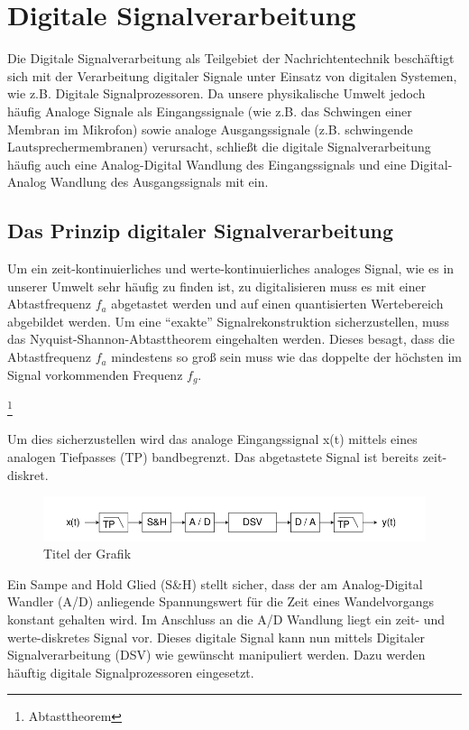 \documentclass[a4paper,12pt,fontsize=12,DIV=12]{scrartcl}
\begin{document}
\section{Digitale Signalverarbeitung}
Die Digitale Signalverarbeitung als Teilgebiet der Nachrichtentechnik beschäftigt sich mit der Verarbeitung digitaler Signale unter Einsatz von digitalen Systemen, wie z.B. Digitale Signalprozessoren.
Da unsere physikalische Umwelt jedoch häufig Analoge Signale als Eingangssignale (wie z.B. das Schwingen einer Membran im Mikrofon) sowie analoge Ausgangssignale (z.B. schwingende Lautsprechermembranen) verursacht, schließt die digitale Signalverarbeitung häufig auch eine Analog-Digital Wandlung des Eingangssignals und eine Digital-Analog Wandlung des Ausgangssignals mit ein.

\subsection{Das Prinzip digitaler Signalverarbeitung}
Um ein zeit-kontinuierliches und werte-kontinuierliches analoges Signal, wie es in unserer Umwelt sehr häufig zu finden ist, zu digitalisieren muss es mit einer Abtastfrequenz $f_a$ abgetastet werden und auf einen quantisierten Wertebereich abgebildet werden. 
Um eine "`exakte"' Signalrekonstruktion sicherzustellen, muss das Nyquist-Shannon-Abtasttheorem eingehalten werden. Dieses besagt, dass die Abtastfrequenz $f_a$ mindestens so groß sein muss wie das doppelte der höchsten im Signal vorkommenden Frequenz $f_g$.
\begin{center}
 \footnote{Abtasttheorem }\\
\end{center}
Um dies sicherzustellen wird das analoge Eingangssignal x(t) mittels eines analogen Tiefpasses (TP) bandbegrenzt. Das abgetastete Signal ist bereits zeit-diskret.
%
\begin{figure}[h]
	\includegraphics[scale=0.5]{Bilder/DSV_Blockschaltbild.png}
	\caption{Titel der Grafik}
	\label{labelname}
\end{figure}
%



Ein Sampe and Hold Glied (S\&H) stellt sicher, dass der am Analog-Digital Wandler (A/D) anliegende Spannungswert für die Zeit eines Wandelvorgangs konstant gehalten wird.
Im Anschluss an die A/D Wandlung liegt ein zeit- und werte-diskretes Signal vor. Dieses digitale Signal kann nun mittels Digitaler Signalverarbeitung (DSV) wie gewünscht manipuliert werden. Dazu werden häuftig digitale Signalprozessoren eingesetzt.
\end{document}
